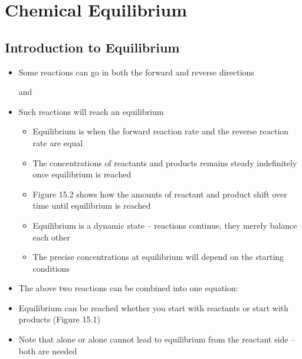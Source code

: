 \documentclass[12pt, openany, letterpaper]{memoir}
\begin{document}
\chapter{Chemical Equilibrium}
\section{Introduction to Equilibrium}
\begin{itemize}
	\item Some reactions can go in both the forward and reverse directions
	
	 and 
	\item Such reactions will reach an equilibrium
	\begin{itemize}
		\item Equilibrium is when the forward reaction rate and the reverse reaction rate are equal
		\item The concentrations of reactants and products remains steady indefinitely once equilibrium is reached
		\item Figure 15.2 shows how the amounts of reactant and product shift over time until equilibrium is reached
		\item Equilibrium is a dynamic state -- reactions continue, they merely balance each other
		\item The precise concentrations at equilibrium will depend on the starting conditions
	\end{itemize}
	\item The above two reactions can be combined into one equation: 
	\item Equilibrium can be reached whether you start with reactants or start with products (Figure 15.1)
	\item Note that  alone or  alone cannot lead to equilibrium from the reactant side -- both are needed
\end{itemize}
\end{document}
